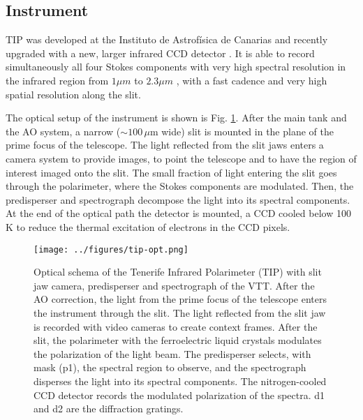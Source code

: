 \subsection{Instrument\label{inst:tip}}
TIP was developed at the Instituto de Astrof\'isica de Canarias  \citep{Martinez-Pillet:1999lr} and recently upgraded with a new, larger infrared CCD detector \citep{Collados:2007fk}. It is able to record simultaneously all four Stokes components with very high spectral resolution in the infrared region from $1 \mu m $ to $2.3 \mu m$ , with a fast cadence and very high spatial resolution along the slit.

The optical setup of the instrument is shown is Fig. \ref{fig:tip:optical}. After the main tank and the AO system, a narrow ($\sim100 \,\mu$m wide) slit is mounted in the plane of the prime focus of the telescope. The light reflected from the slit jaws enters a camera system to provide images, to point the telescope and to have the region of interest imaged onto the slit. The small fraction of light entering the slit goes through  the polarimeter, where the Stokes components are modulated. Then, the predisperser and spectrograph  decompose the light into its spectral components. At the end of the optical path the detector is mounted, a CCD cooled below 100 K
 to reduce the thermal excitation of electrons in the CCD pixels.
 
\begin{figure}[t]
\begin{center}
\texttt{[image: ../figures/tip-opt.png]}
\caption{Optical schema of the Tenerife Infrared Polarimeter (TIP) with slit jaw camera, predisperser and spectrograph of the VTT. After the AO correction, the light from the prime focus of the telescope enters the instrument through the slit. The light reflected from the slit jaw is recorded with video cameras to create context frames.  After the slit, the polarimeter with the ferroelectric liquid crystals modulates the polarization of the light beam. The predisperser selects, with mask (p1), the spectral region to observe, and the spectrograph disperses the light into its spectral components. The nitrogen-cooled CCD detector records the modulated polarization of the spectra. d1 and d2 are the diffraction gratings.}
\label{fig:tip:optical}
\end{center}
\end{figure}

